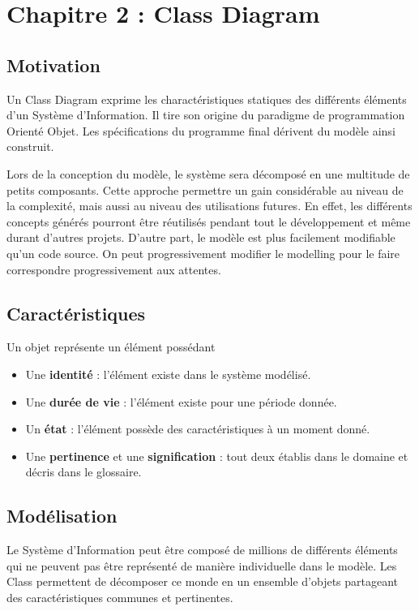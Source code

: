 \documentclass[../Syllabus.tex]{subfiles}
\begin{document}
\section{Chapitre 2 : Class Diagram}

\subsection{Motivation}

Un Class Diagram exprime les charactéristiques statiques des différents éléments d'un Système d'Information. Il tire son origine du paradigme de programmation Orienté Objet. Les spécifications du programme final dérivent du modèle ainsi construit.

Lors de la conception du modèle, le système sera décomposé en une multitude de petits composants. Cette approche permettre un gain considérable au niveau de la complexité, mais aussi au niveau des utilisations futures. En effet, les différents concepts générés pourront être réutilisés pendant tout le développement et même durant d'autres projets. D'autre part, le modèle est plus facilement modifiable qu'un code source. On peut progressivement modifier le modelling pour le faire correspondre progressivement aux attentes.

\subsection{Caractéristiques}

Un objet représente un élément possédant

\begin{itemize}
  \item Une \textbf{identité} : l'élément existe dans le système modélisé.
  \item Une \textbf{durée de vie} : l'élément existe pour une période donnée.
  \item Un \textbf{état} : l'élément possède des caractéristiques à un moment donné.
  \item Une \textbf{pertinence} et une \textbf{signification} : tout deux établis dans le domaine et décris dans le glossaire.
\end{itemize}

\subsection{Modélisation}

Le Système d'Information peut être composé de millions de différents éléments qui ne peuvent pas être représenté de manière individuelle dans le modèle. Les Class permettent de décomposer ce monde en un ensemble d'objets partageant des caractéristiques communes et pertinentes.

\end{document}
